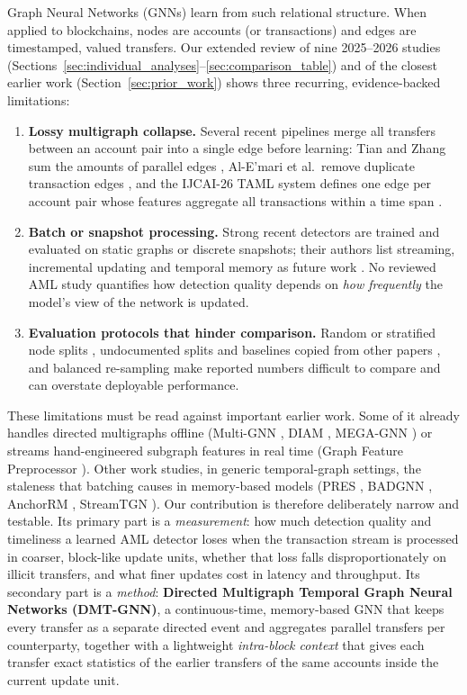 \documentclass[11pt,a4paper]{article}
\begin{document}
Graph Neural Networks (GNNs) \cite{kipf2017gcn,hamilton2017sage,velickovic2018gat} learn from such relational structure. When applied to blockchains, nodes are accounts (or transactions) and edges are timestamped, valued transfers. Our extended review of nine 2025--2026 studies (Sections~\ref{sec:individual_analyses}--\ref{sec:comparison_table}) and of the closest earlier work (Section~\ref{sec:prior_work}) shows three recurring, evidence-backed limitations:
\begin{enumerate}[leftmargin=*]
    \item \textbf{Lossy multigraph collapse.} Several recent pipelines merge all transfers between an account pair into a single edge before learning: Tian and Zhang sum the amounts of parallel edges \cite{tian2025kar}, Al-E'mari et al.\ remove duplicate transaction edges \cite{alemari2026explainable}, and the IJCAI-26 TAML system defines one edge per account pair whose features aggregate all transactions within a time span \cite{rico2026taml}.
    \item \textbf{Batch or snapshot processing.} Strong recent detectors are trained and evaluated on static graphs or discrete snapshots; their authors list streaming, incremental updating and temporal memory as future work \cite{lin2026chronowave,jia2025lmae4eth}. No reviewed AML study quantifies how detection quality depends on \emph{how frequently} the model's view of the network is updated.
    \item \textbf{Evaluation protocols that hinder comparison.} Random or stratified node splits \cite{jia2025lmae4eth,kasula2025ajk,alemari2026explainable}, undocumented splits and baselines copied from other papers \cite{li2025tfgat}, and balanced re-sampling \cite{tian2025kar} make reported numbers difficult to compare and can overstate deployable performance.
\end{enumerate}

These limitations must be read against important earlier work. Some of it already handles directed multigraphs offline (Multi-GNN \cite{egressy2024multigraph}, DIAM \cite{ding2024diam}, MEGA-GNN \cite{bilgi2026mega}) or streams hand-engineered subgraph features in real time (Graph Feature Preprocessor \cite{blanusa2024gfp}). Other work studies, in generic temporal-graph settings, the staleness that batching causes in memory-based models (PRES \cite{su2024pres}, BADGNN \cite{zhou2025badgnn}, AnchorRM \cite{anchorrm2026}, StreamTGN \cite{streamtgn2026}). Our contribution is therefore deliberately narrow and testable. Its primary part is a \emph{measurement}: how much detection quality and timeliness a learned AML detector loses when the transaction stream is processed in coarser, block-like update units, whether that loss falls disproportionately on illicit transfers, and what finer updates cost in latency and throughput. Its secondary part is a \emph{method}: \textbf{Directed Multigraph Temporal Graph Neural Networks (DMT-GNN)}, a continuous-time, memory-based GNN that keeps every transfer as a separate directed event and aggregates parallel transfers per counterparty, together with a lightweight \emph{intra-block context} that gives each transfer exact statistics of the earlier transfers of the same accounts inside the current update unit.
\end{document}
